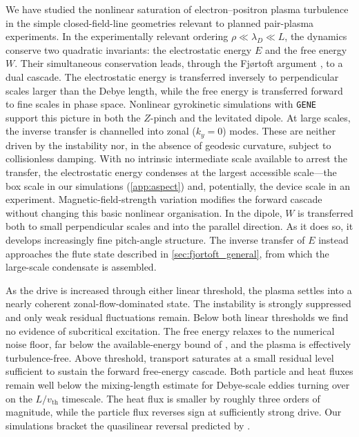 \documentclass{jpp}
\newcommand{\vth}{v_\text{th}}
\newcommand{\lambdaD}{\lambda_D}
\newcommand{\gene}{\texttt{GENE}}
\begin{document}
We have studied the nonlinear saturation of electron--positron plasma turbulence in the simple closed-field-line geometries relevant to planned pair-plasma experiments. In the experimentally relevant ordering $\rho \ll \lambdaD \ll L$, the dynamics conserve two quadratic invariants: the electrostatic energy $E$ and the free energy $W$. Their simultaneous conservation leads, through the Fj\o rtoft argument \citep{Fjortoft1953}, to a dual cascade. The electrostatic energy is transferred inversely to perpendicular scales larger than the Debye length, while the free energy is transferred forward to fine scales in phase space. Nonlinear gyrokinetic simulations with \gene\ \citep{Jenko2000} support this picture in both the $Z$-pinch and the levitated dipole. At large scales, the inverse transfer is channelled into zonal ($k_y=0$) modes. These are neither driven by the instability nor, in the absence of geodesic curvature, subject to collisionless damping. With no intrinsic intermediate scale available to arrest the transfer, the electrostatic energy condenses at the largest accessible scale---the box scale in our simulations (\cref{app:aspect}) and, potentially, the device scale in an experiment. Magnetic-field-strength variation modifies the forward cascade without changing this basic nonlinear organisation. In the dipole, $W$ is transferred both to small perpendicular scales and into the parallel direction. As it does so, it develops increasingly fine pitch-angle structure. The inverse transfer of $E$ instead approaches the flute state described in \cref{sec:fjortoft_general}, from which the large-scale condensate is assembled.

As the drive is increased through either linear threshold, the plasma settles into a nearly coherent zonal-flow-dominated state. The instability is strongly suppressed and only weak residual fluctuations remain. Below both linear thresholds we find no evidence of subcritical excitation. The free energy relaxes to the numerical noise floor, far below the available-energy bound of \citet{Helander2017}, and the plasma is effectively turbulence-free. Above threshold, transport saturates at a small residual level sufficient to sustain the forward free-energy cascade. Both particle and heat fluxes remain well below the mixing-length estimate for Debye-scale eddies turning over on the $L/\vth$ timescale. The heat flux is smaller by roughly three orders of magnitude, while the particle flux reverses sign at sufficiently strong drive. Our simulations bracket the quasilinear reversal predicted by \citet{HelanderConnor2016}.
\end{document}
